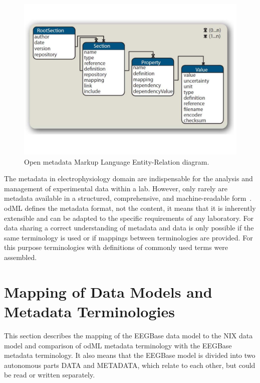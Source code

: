 \documentclass[conference]{IEEEtran}
\begin{document}
\begin{figure}[!t]
\centering
\includegraphics[scale=0.3]{obrazky/odml_tree.pdf}
\caption{Open metadata Markup Language Entity-Relation diagram. \cite{odml}}
\label{odml-tree}
\end{figure}
	
The metadata in electrophysiology domain are indispensable for the analysis and management of experimental data within a lab. However, only rarely are metadata available in a structured, comprehensive, and machine-readable form~\cite{odml}. odML defines the metadata format, not the content, it means that it is inherently extensible and can be adapted to the specific requirements of any laboratory. For data sharing a correct understanding of metadata and data is only possible if the same terminology is used or if mappings between terminologies are provided. For this purpose terminologies with definitions of commonly used terms were assembled.~\cite{odmlarticle}


\section{Mapping of Data Models and Metadata Terminologies}

This section describes the mapping of the EEGBase data model to the NIX data model and comparison of odML metadata terminology with the EEGBase metadata terminology. It also means that the EEGBase model is divided into two autonomous parts DATA and METADATA, which relate to each other, but could be read or written separately.
\end{document}
